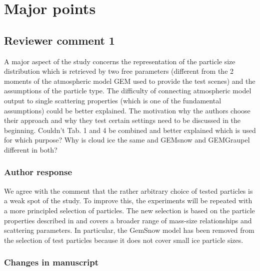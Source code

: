 
\section{Major points}

\subsection*{Reviewer comment 1}

A major aspect of the study concerns the representation of the particle size
distribution which is retrieved by two free parameters (different from the 2
moments of the atmospheric model GEM used to provide the test scenes) and the
assumptions of the particle type. The difficulty of connecting atmospheric model
output to single scattering properties (which is one of the fundamental
assumptions) could be better explained. The motivation why the authors choose
their approach and why they test certain settings need to be discussed in the
beginning. Couldn’t Tab. 1 and 4 be combined and better explained which is used
for which purpose? Why is cloud ice the same and GEMsnow and GEMGraupel different
in both?

\subsubsection*{Author response}

We agree with the comment that the rather arbitrary choice of tested particles
is a weak spot of the study. To improve this, the experiments will be repeated
with a more principled selection of particles. The new selection is based on the
particle properties described in \citet{ekelund20} and covers a broader range of
mass-size relationships and scattering parameters. In particular, the GemSnow
model has been removed from the selection of test particles because it does not
cover small ice particle sizes.


\subsubsection{Changes in manuscript}


